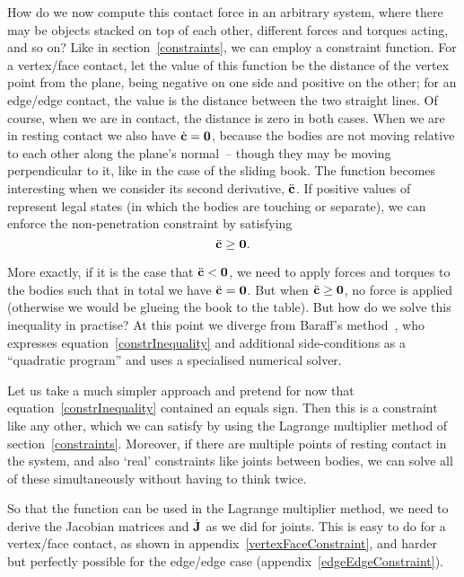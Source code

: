 How do we now compute this contact force in an arbitrary system, where there may be objects stacked
on top of each other, different forces and torques acting, and so on? Like in
section~\ref{constraints}, we can employ a constraint function. For a vertex/face contact, let the
value of this function  be the distance of the vertex point from the plane, being negative on
one side and positive on the other; for an edge/edge contact, the value is the distance between the
two straight lines. Of course, when we are in contact, the distance is zero in both cases. When we
are in resting contact we also have $\dot{\ve{c}} = \ve{0}$, because the bodies are not moving
relative to each other along the plane's normal~-- though they may be moving perpendicular to it,
like in the case of the sliding book. The function becomes interesting when we consider its second
derivative, $\ddot{\ve{c}}$. If positive values of  represent legal states (in which the
bodies are touching or separate), we can enforce the non-penetration constraint by satisfying
\begin{equation} \label{constrInequality}
\ddot{\ve{c}} \ge \ve{0}.
\end{equation}

More exactly, if it is the case that $\ddot{\ve{c}} < \ve{0}$, we need to apply forces and torques
to the bodies such that in total we have $\ddot{\ve{c}} = \ve{0}$. But when
$\ddot{\ve{c}} \ge \ve{0}$, no force is applied (otherwise we would be glueing the book to the
table). But how do we solve this inequality in practise? At this point we diverge from Baraff's
method~\cite{BaraffWitkin:97}, who expresses equation~\ref{constrInequality} and additional
side-conditions as a ``quadratic program'' and uses a specialised numerical solver.

Let us take a much simpler approach and pretend for now that equation~\ref{constrInequality}
contained an equals sign. Then this is a constraint like any other, which we can satisfy by using
the Lagrange multiplier method of section~\ref{constraints}. Moreover, if there are multiple
points of resting contact in the system, and also `real' constraints like joints between bodies,
we can solve all of these simultaneously without having to think twice.

So that the function  can be used in the Lagrange multiplier method, we need to derive the
Jacobian matrices  and $\dot{\m{J}}$ as we did for joints. This is easy to do for a
vertex/face contact, as shown in appendix~\ref{vertexFaceConstraint}, and harder but perfectly
possible for the edge/edge case (appendix~\ref{edgeEdgeConstraint}).

